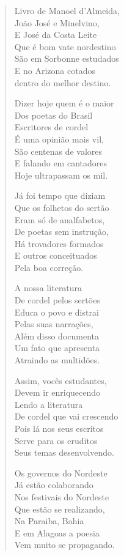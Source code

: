 \begin{verse}
Livro de Manoel d'Almeida, \\
João José e Minelvino, \\
E José da Costa Leite \\
Que é bom vate nordestino \\
São em Sorbonne estudados \\
E no Arizona cotados \\
dentro do melhor destino. 

Dizer hoje quem é o maior \\
Dos poetas do Brasil \\
Escritores de cordel \\
É uma opinião mais vil, \\
São centenas de valores \\
E falando em cantadores \\
Hoje ultrapassam os mil. 

Já foi tempo que diziam \\
Que os folhetos do sertão \\
Eram só de analfabetos, \\
De poetas sem instrução, \\
Há trovadores formados \\
E outros conceituados \\
Pela boa correção. 


A nossa literatura \\
De cordel pelos sertões \\
Educa o povo e distrai \\
Pelas suas narrações, \\
Além disso documenta \\
Um fato que apresenta \\
Atraindo as multidões. 

Assim, vocês estudantes, \\
Devem ir enriquecendo \\
Lendo a literatura \\
De cordel que vai crescendo \\
Pois lá nos seus escritos \\
Serve para os eruditos \\
Seus temas desenvolvendo. 

Os governos do Nordeste \\
Já estão colaborando \\
Nos festivais do Nordeste \\
Que estão se realizando, \\
Na Paraiba, Bahia \\
E em Alagoas a poesia \\
Vem muito se propagando. 


\end{verse}

